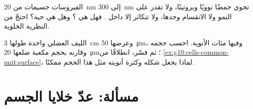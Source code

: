 \begin{exercise}[$\star\star\star$]\label{exo:g10:cells-common-unit:14}
الفيروسات جسيمات من \qty{20}{nm} إلى \qty{300}{nm} تحوي حمضًا نوويًا
وبروتينًا، ولا تقدر على النمو ولا الانقسام وحدها، ولا تتكاثر إلا داخل
. فهل هي ؟ وهل هي حية؟ احتجّ من النظرية الخلوية.
\end{exercise}

\begin{exercise}[$\star\star\star$]\label{exo:g10:cells-common-unit:15}
الليف العضلي  واحدة طولها \qty{3}{cm} وعرضها \qty{50}{\micro m}،
وفيها مئات الأنوية. احسب حجمه وقارنه بحجم  مكعبة ضلعها
\qty{20}{\micro m}؛ ثم فسّر، انطلاقًا من
\cref{ex:g10:cells-common-unit:surface}، لماذا يجعل شكله وكثرة أنويته
مثل هذا الحجم ممكنًا.
\end{exercise}

\section{مسألة: عدّ خلايا الجسم}

